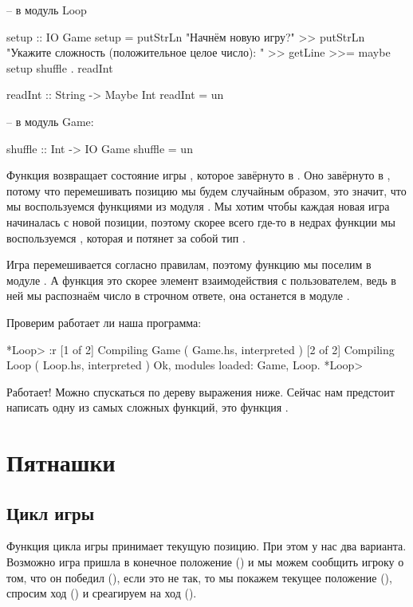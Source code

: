 \begin{code}
-- в модуль Loop

setup :: IO Game
setup = putStrLn "Начнём новую игру?" >>
    putStrLn "Укажите сложность (положительное целое число): " >>
    getLine >>= maybe setup shuffle . readInt 

readInt :: String -> Maybe Int
readInt = un

-- в модуль Game:

shuffle :: Int -> IO Game
shuffle = un
\end{code}

Функция  возвращает состояние игры ,
которое завёрнуто в . Оно завёрнуто в , потому
что перемешивать позицию мы будем случайным образом, это
значит, что мы воспользуемся функциями из модуля .
Мы хотим чтобы каждая новая игра начиналась с новой позиции,
поэтому скорее всего где-то в недрах функции 
мы воспользуемся , которая и потянет за собой
тип . 

Игра перемешивается согласно правилам, поэтому функцию
 мы поселим в модуле . А функция 
 это скорее элемент взаимодействия с пользователем,
ведь в ней мы распознаём число в строчном ответе, 
она останется в модуле .

Проверим работает ли наша программа:


\begin{code}
*Loop> :r
[1 of 2] Compiling Game             ( Game.hs, interpreted )
[2 of 2] Compiling Loop             ( Loop.hs, interpreted )
Ok, modules loaded: Game, Loop.
*Loop> 
\end{code}

Работает! Можно спускаться по дереву выражения ниже. 
Сейчас нам предстоит написать одну из самых сложных 
функций, это функция .

\section{Пятнашки}

\subsection{Цикл игры}

Функция цикла игры принимает текущую позицию. При этом
у нас два варианта. Возможно игра пришла в конечное положение
() и мы можем сообщить игроку о том, что 
он победил (), если это не так, то мы 
покажем текущее положение (),
спросим ход () и среагируем на ход 
().

